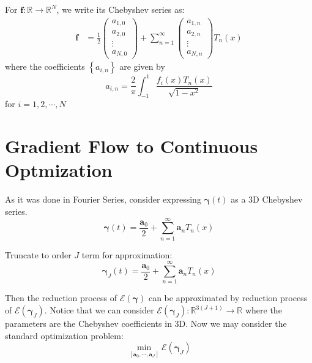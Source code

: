 \documentclass[a4paper]{article}
\newcommand{\gammabf}{\boldsymbol{\gamma}}
\begin{document}
For $\mathbf{f}:\mathbb{R} \rightarrow \mathbb{R}^N$, we write its Chebyshev series as:
\begin{align}
    \mathbf{f} &= \frac{1}{2}
    \begin{pmatrix}
        a_{1,0} \\
        a_{2,0} \\
        \vdots \\
        a_{N,0}
    \end{pmatrix}
    +
    \sum_{n = 1}^{\infty} 
    \begin{pmatrix}
        a_{1,n} \\
        a_{2,n} \\
        \vdots \\
        a_{N,n}
    \end{pmatrix}
    T_n(x)
\end{align}
where the coefficients $\left\{ a_{i,n} \right\}$ are given by
\begin{equation}
    a_{i,n} = \frac{2}{\pi} \int_{-1}^{1} \frac{f_i(x) T_n(x)}{\sqrt{1-x^2}}
\end{equation}
for $i = 1, 2, \cdots, N$

\section{Gradient Flow to Continuous Optmization}
As it was done in Fourier Series, consider expressing $\gammabf (t)$ as a 3D Chebyshev series.
\begin{equation}
    \gammabf(t) = \frac{\mathbf{a}_0}{2} + \sum_{n=1}^{\infty} \mathbf{a}_n T_n(x)
\end{equation}

Truncate to order $J$ term for approximation:
\begin{equation}
    \gammabf_J (t) = \frac{\mathbf{a}_0}{2} + \sum_{n=1}^{\infty} \mathbf{a}_n T_n(x)
\end{equation}

Then the reduction process of $\mathcal{E} \left( \gammabf \right)$ can be approximated by reduction process of $\mathcal{E} \left( \gammabf_J \right)$. Notice that we can consider $\mathcal{E} \left( \gammabf_J \right): \mathbb{R}^{3(J + 1)} \rightarrow \mathbb{R}$ where the parameters are the Chebyshev coefficients in 3D.
Now we may consider the standard optimization problem:
\begin{equation}
    \min_{\left[ \mathbf{a}_0, \cdots, \mathbf{a}_J \right]} \mathcal{E} \left( \gammabf_J \right)
\end{equation}
\end{document}
